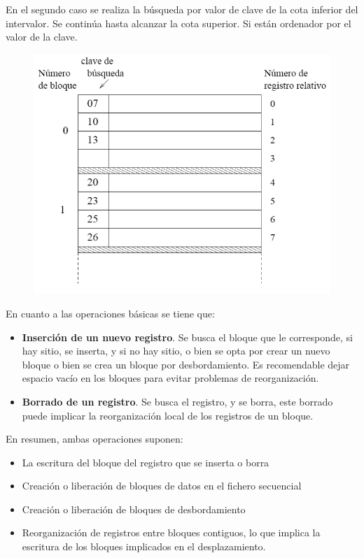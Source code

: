 \documentclass[a4paper,11pt]{article}
\begin{document}
En el segundo caso se realiza la búsqueda por valor de clave de la cota inferior del intervalor. Se continúa hasta alcanzar la cota superior. Si están ordenador por el valor de la clave.

\begin{figure}[h]
\centering
\includegraphics[scale=1,width=1\textwidth]{organizacion_secuencial.png}
\end{figure}

En cuanto a las operaciones básicas se tiene que:

\begin{itemize}
\item \textbf{Inserción de un nuevo registro}. Se busca el bloque que le corresponde, si hay sitio, se inserta, y si no hay sitio, o bien se opta por crear un nuevo bloque o bien se crea un bloque por desbordamiento. Es recomendable dejar espacio vacío en los bloques para evitar problemas de reorganización.

\item \textbf{Borrado de un registro}. Se busca el registro, y se borra, este borrado puede implicar la reorganización local de los registros de un bloque.
\end{itemize}

En resumen, ambas operaciones suponen:

\begin{itemize}
\item La escritura del bloque del registro que se inserta o borra
\item Creación o liberación de bloques de datos en el fichero secuencial
\item Creación o liberación de bloques de desbordamiento
\item Reorganización de registros entre bloques contiguos, lo que implica la escritura de los bloques implicados en el desplazamiento.
\end{itemize}
\end{document}
